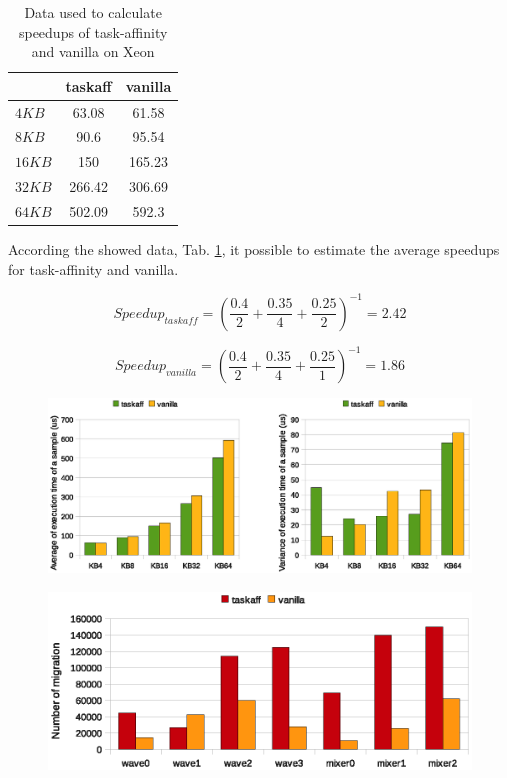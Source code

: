 \begin{table}[tbp]
{
\begin{tabular}{|l|c|c|}
	\hline
	& taskaff & vanilla \\ \hline
	$4KB$ & 63.08 & 61.58 \\ \hline
	$8KB$ & 90.6 & 95.54 \\ \hline
	$16KB$ & 150 & 165.23 \\ \hline
	$32KB$ & 266.42 & 306.69 \\ \hline
	$64KB$ & 502.09 & 592.3 \\ \hline
\end{tabular}
\label{tab:final_time_xeon}
}
\label{tab:final_time_speedup_xeon}
\caption{Data used to calculate speedups of task-affinity and vanilla on Xeon}
\end{table}

According the showed data, Tab. \ref{tab:final_time_speedup_xeon}, it possible to estimate the average speedups for task-affinity and vanilla.

\begin{equation}
  Speedup_{taskaff} = \left( \frac{0.4}{2} + \frac{0.35}{4} + \frac{0.25}{2} \right)^{-1} = 2.42
\label{eq:speedup_xeon_taskaff}
\end{equation}

\begin{equation}
  Speedup_{vanilla} = \left(\frac{0.4}{2} + \frac{0.35}{4} + \frac{0.25}{1} \right)^{-1} = 1.86
\label{eq:speedup_xeon_van}
\end{equation}

\begin{figure}[htbp]
\centering
\includegraphics[width=\widefigure]{images/results_xeon/time_avg_var.eps}
\caption{}
\label{fig:time_avg_var_xeon}
\end{figure}

\begin{figure}[htbp]
\centering
\includegraphics[width=\widefigure]{images/results_xeon/migration_xeon.eps}
\caption{}
\label{fig:migration_xeon}
\end{figure}

